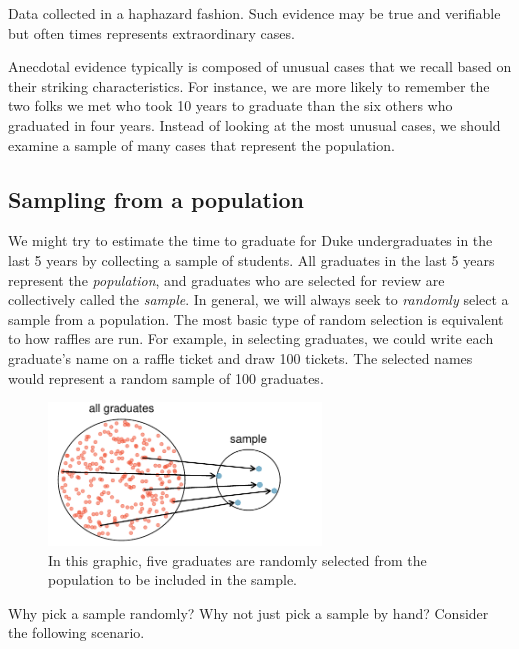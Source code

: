 \begin{termBox}{
Data collected in a haphazard fashion. Such evidence may be true and verifiable but often times represents extraordinary cases.}
\end{termBox}

Anecdotal evidence typically is composed of unusual cases that we recall based on their striking characteristics. For instance, we are more likely to remember the two folks we met who took 10 years to graduate than the six others who graduated in four years. Instead of looking at the most unusual cases, we should examine a sample of many cases that represent the population.

\subsection{Sampling from a population}


We might try to estimate the time to graduate for Duke undergraduates in the last 5 years by collecting a sample of students. All graduates in the last 5 years represent the \emph{population}, and graduates who are selected for review are collectively called the \emph{sample}. In general, we will always seek to \emph{randomly} select a sample from a population. The most basic type of random selection is equivalent to how raffles are run. For example, in selecting graduates, we could write each graduate's name on a raffle ticket and draw 100 tickets. The selected names would represent a random sample of 100 graduates.
\begin{figure}[ht]
\centering
\includegraphics[height=1.5in]{01/figures/popToSample/popToSampleGraduates}
\caption{In this graphic, five graduates are randomly selected from the population to be included in the sample.}
\label{popToSampleGraduates}
\end{figure}

Why pick a sample randomly? Why not just pick a sample by hand? Consider the following scenario.

